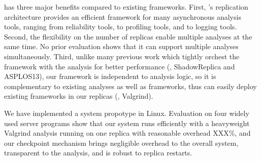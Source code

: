 \xxx has three major benefits compared to existing frameworks. First, \xxx's 
replication architecture provides an efficient framework for many asynchronous 
analysis tools, ranging from reliability tools, to profiling tools, and to 
logging tools. Second, the flexibility on the number of replicas enable 
multiple analyses at the same time. No prior evaluation shows that it can 
support multiple analyses simultaneously. Third, unlike many previous work 
which tightly orchest the framework with the analysis for better performance 
(\eg, ShadowReplica and ASPLOS13), our framework is independent to analysis 
logic, so it is complementary to existing analyses as well as frameworks, thus 
\xxx can easily deploy existing frameworks in our replicas (\eg, Valgrind).


We have implemented a \xxx system propotype in Linux. Evaluation on four widely 
used server programs show that our system runs efficiently with a heavyweight 
Valgrind analysis running on one replica with reasonable overhead XXX\%, and 
our checkpoint mechanism brings negligible overhead to the overall system, 
transparent to the analysis, and is robust to replica restarts.





% 

